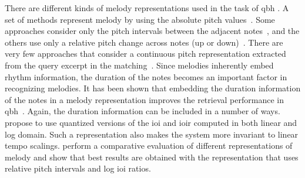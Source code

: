 There are different kinds of melody representations used in the task of \gls{qbh} . A set of methods represent melody by using the absolute pitch values~\citep{McNab1996,uitdenbogerd1998manipulation}. Some approaches consider only the pitch intervals between the adjacent notes~\citep{pauws2004cubyhum}, and the others use only a relative pitch change across notes (up or down)~\citep{ghias1995query}. There are very few approaches that consider a continuous pitch representation extracted from the query excerpt in the matching~\citep{mazzoni2001melody}. Since melodies inherently embed rhythm information, the duration of the notes becomes an important factor in recognizing melodies. It has been shown that embedding the duration information of the notes in a melody representation improves the retrieval performance in \gls{qbh}~\citep{pardo2002encoding}. Again, the duration information can be included in a number of ways. \cite{pardo2002encoding} propose to use quantized versions of the \gls{ioi} and \gls{ioir} computed in both linear and log domain. Such a representation also makes the system more invariant to linear tempo scalings. \cite{dannenberg2007comparative} perform a comparative evaluation of different representations of melody and show that best results are obtained with the representation that uses relative pitch intervals and log \gls{ioi} ratios. 

